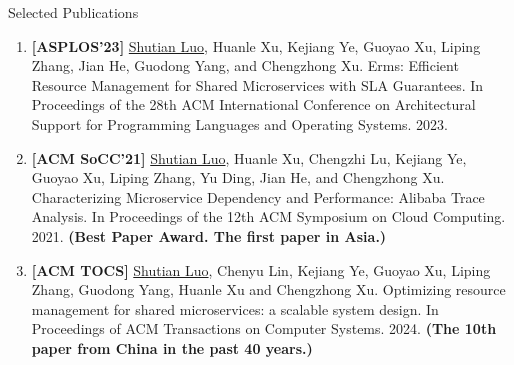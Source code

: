 \documentclass{resume} %
\begin{document}
\begin{rSection}{Selected Publications}
\begin{enumerate}
        \item \textbf{[ASPLOS'23]} \underline{Shutian Luo}, Huanle Xu, Kejiang Ye, Guoyao Xu, Liping Zhang, Jian He, Guodong Yang, and Chengzhong Xu. Erms: Efficient Resource Management for Shared Microservices with SLA Guarantees. In Proceedings of the 28th ACM International Conference on Architectural Support for Programming Languages and Operating Systems. 2023. 
        \item \textbf{[ACM SoCC'21]} \underline{Shutian Luo}, {Huanle Xu}, Chengzhi Lu, Kejiang Ye, Guoyao Xu, Liping Zhang, Yu Ding, Jian He, and Chengzhong Xu. Characterizing Microservice Dependency and Performance: Alibaba Trace Analysis. In Proceedings of the 12th ACM Symposium on Cloud Computing. 2021. 
        \textbf{(Best Paper Award. The first paper in Asia.)}
        \item \textbf{[ACM TOCS]} \underline{Shutian Luo}, Chenyu Lin, Kejiang Ye, Guoyao Xu, Liping Zhang, Guodong Yang, Huanle Xu and Chengzhong Xu. Optimizing resource management for shared microservices: a scalable system design. In Proceedings of ACM Transactions on Computer Systems. 2024. \textbf{(The 10th paper from China in the past 40 years.)}
\end{enumerate}
\end{rSection}
\end{document}
